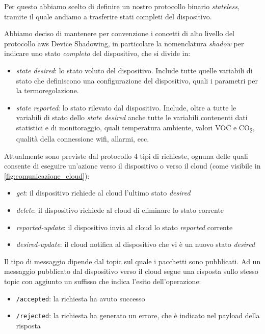 \documentclass[12pt,a4paper,twoside,titlepage]{book}
\begin{document}
Per questo abbiamo scelto di definire un nostro protocollo binario \textit{stateless},
tramite il quale andiamo a trasferire stati completi del dispositivo.

Abbiamo deciso di mantenere per convenzione i concetti di alto livello del protocollo \Gls{aws}
Device Shadowing, in particolare la nomenclatura \textit{shadow} per indicare uno stato \textit{completo} del
dispositivo, che si divide in:
\begin{itemize}
    \item \textit{state desired}: lo stato voluto del dispositivo. Include tutte quelle variabili di stato 
        che definiscono una configurazione del dispositivo, quali i parametri per la termoregolazione.
    \item \textit{state reported}: lo stato rilevato dal dispositivo. Include, oltre a tutte le variabili 
        di stato dello \textit{state desired} anche tutte le variabili contenenti dati statistici e di monitoraggio,
        quali temperatura ambiente, valori VOC e CO\textsubscript{2}, qualità della connessione \Gls{wifi}, allarmi, ecc. 
\end{itemize}

Attualmente sono previste dal protocollo 4 tipi di richieste, ognuna delle quali consente di eseguire un'azione verso 
il dispositivo o verso il \gls{cloud} (come visibile in \autoref{fig:comunicazione_cloud}):

\begin{itemize}
    \item \textit{get}: il dispositivo richiede al \gls{cloud} l'ultimo stato \textit{desired}
    \item \textit{delete}: il dispositivo richiede al \gls{cloud} di eliminare lo stato corrente
    \item \textit{reported-update}: il dispositivo invia al \gls{cloud} lo stato \textit{reported} corrente
    \item \textit{desired-update}: il \gls{cloud} notifica al dispositivo che vi è un nuovo stato \textit{desired}
\end{itemize}

Il tipo di messaggio dipende dal \gls{topic} sul quale i pacchetti sono pubblicati. Ad
un messaggio pubblicato dal dispositivo verso il \gls{cloud} segue una risposta sullo stesso \gls{topic}
con aggiunto un suffisso che indica l'esito dell'operazione:
\begin{itemize}
    \item \texttt{/accepted}: la richiesta ha avuto successo
    \item \texttt{/rejected}: la richiesta ha generato un errore, che è indicato nel payload della risposta
\end{itemize}
\end{document}
